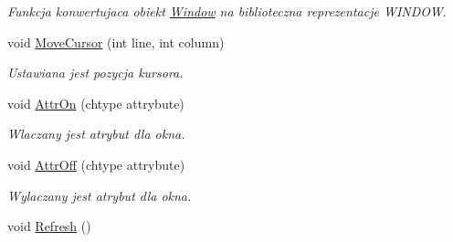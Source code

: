 \begin{DoxyCompactItemize}
\begin{DoxyCompactList}\small\item\em Funkcja konwertujaca obiekt \hyperlink{class_window}{Window} na biblioteczna reprezentacje W\+I\+N\+D\+O\+W. \end{DoxyCompactList}\item 
void \hyperlink{class_window_ac6e11dee115c399181fa26c0b490d2f5}{Move\+Cursor} (int line, int column)
\begin{DoxyCompactList}\small\item\em Ustawiana jest pozycja kursora. \end{DoxyCompactList}\item 
void \hyperlink{class_window_ac68276b9e19407a0c78c0a47c5786f1a}{Attr\+On} (chtype attrybute)
\begin{DoxyCompactList}\small\item\em Wlaczany jest atrybut dla okna. \end{DoxyCompactList}\item 
void \hyperlink{class_window_a8baa301a84f4575a519f413e0d46d388}{Attr\+Off} (chtype attrybute)
\begin{DoxyCompactList}\small\item\em Wylaczany jest atrybut dla okna. \end{DoxyCompactList}\item 
\hypertarget{class_window_ae2408e16042a51630a490c2831638a4c}{}void \hyperlink{class_window_ae2408e16042a51630a490c2831638a4c}{Refresh} ()\label{class_window_ae2408e16042a51630a490c2831638a4c}


\end{DoxyCompactItemize}
